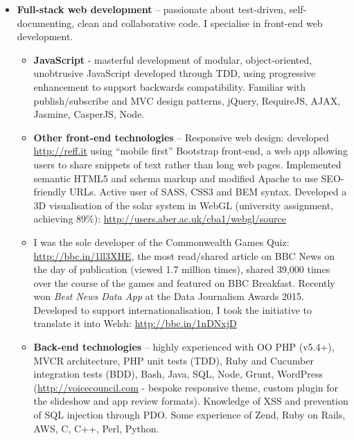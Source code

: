 \documentclass[class=article, crop=false]{standalone}
\begin{document}
\begin{itemize}
    \setlength\itemsep{0.3em}

    \item \textbf{Full-stack web development} – passionate about test-driven, self-documenting, clean and collaborative code. I specialise in front-end web development.

    \begin{itemize}
        \setlength\itemsep{0.3em}

        \item \textbf{JavaScript} - masterful development of modular, object-oriented, unobtrusive JavaScript developed through TDD, using progressive enhancement to support backwards compatibility. Familiar with publish/subscribe and MVC design patterns, jQuery, RequireJS, AJAX, Jasmine, CasperJS, Node.

        \item \textbf{Other front-end technologies} – Responsive web design: developed \url{http://reff.it} using “mobile first” Bootstrap front-end, a web app allowing users to share snippets of text rather than long web pages. Implemented semantic HTML5 and schema markup and modified Apache to use SEO-friendly URLs. Active user of SASS, CSS3 and BEM syntax. Developed a 3D visualisation of the solar system in WebGL (university assignment, achieving 89\%): \url{http://users.aber.ac.uk/cba1/webgl/source}

        \item I was the sole developer of the Commonwealth Games Quiz: \url{http://bbc.in/1ll3XHE}, the most read/shared article on BBC News on the day of publication (viewed 1.7 million times), shared 39,000 times over the course of the games and featured on BBC Breakfast. Recently won \emph{Best News Data App} at the Data Journalism Awards 2015. Developed to support internationalisation, I took the initiative to translate it into Welsh: \url{http://bbc.in/1nDNxjD}

        \item \textbf{Back-end technologies} – highly experienced with OO PHP (v5.4+), MVCR architecture, PHP unit tests (TDD), Ruby and Cucumber integration tests (BDD), Bash, Java, SQL, Node, Grunt, WordPress (\url{http://voicecouncil.com} - bespoke responsive theme, custom plugin for the slideshow and app review formats). Knowledge of XSS and prevention of SQL injection through PDO. Some experience of Zend, Ruby on Rails, AWS, C, C++, Perl, Python.

    \end{itemize}


\end{itemize}
\end{document}
